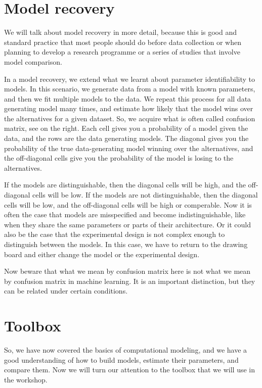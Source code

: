 \documentclass[12pt]{article}
\begin{document}
\section{Model recovery}

We will talk about model recovery in more detail, because this is good and standard practice that most people should do before data collection or when planning to develop a research programme or a series of studies that involve model comparison.

In a model recovery, we extend what we learnt about parameter identifiability to models. In this scenario, we generate data from a model with known parameters, and then we fit multiple models to the data. We repeat this process for all data generating model many times, and estimate how likely that the model wins over the alternatives for a given dataset. So, we acquire what is often called confusion matrix, see on the right. Each cell gives you a probability of a model given the data, and the rows are the data generating models. The diagonal gives you the probability of the true data-generating model winning over the alternatives, and the off-diagonal cells give you the probability of the model is losing to the alternatives.

If the models are distinguishable, then the diagonal cells will be high, and the off-diagonal cells will be low. If the models are not distinguishable, then the diagonal cells will be low, and the off-diagonal cells will be high or comperable. Now it is often the case that models are misspecified and become indistinguishable, like when they share the same parameters or parts of their architecture. Or it could also be the case that the experimental design is not complex enough to distinguish between the models. In this case, we have to return to the drawing board and either change the model or the experimental design.

Now beware that what we mean by confusion matrix here is not what we mean by confusion matrix in machine learning. It is an important distinction, but they can be related under certain conditions.


\section{Toolbox}

So, we have now covered the basics of computational modeling, and we have a good understanding of how to build models, estimate their parameters, and compare them. Now we will turn our attention to the toolbox that we will use in the workshop.
\end{document}
